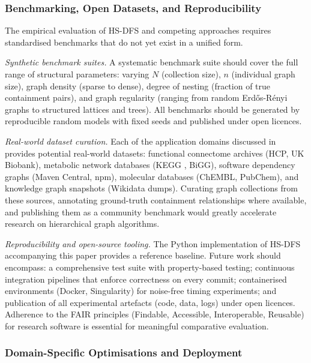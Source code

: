 ﻿\documentclass[12pt,a4paper]{article}
\theoremstyle{plain}
\theoremstyle{definition}
\theoremstyle{remark}
\begin{document}
	\subsubsection*{Benchmarking, Open Datasets, and Reproducibility}

	The empirical evaluation of HS-DFS and competing approaches requires
	standardised benchmarks that do not yet exist in a unified form.

	\emph{Synthetic benchmark suites.}  A systematic benchmark suite should
	cover the full range of structural parameters: varying $N$ (collection
	size), $n$ (individual graph size), graph density (sparse to dense),
	degree of nesting (fraction of true containment pairs), and graph
	regularity (ranging from random Erd\H{o}s-R\'enyi graphs to structured
	lattices and trees).  All benchmarks should be generated by reproducible
	random models with fixed seeds and published under open licences.

	\emph{Real-world dataset curation.}  Each of the application domains
	discussed in  provides potential real-world
	datasets: functional connectome archives (HCP, UK Biobank), metabolic
	network databases (KEGG \cite{kegg}, BiGG), software dependency graphs
	(Maven Central, npm), molecular databases (ChEMBL, PubChem), and
	knowledge graph snapshots (Wikidata dumps).  Curating graph collections
	from these sources, annotating ground-truth containment relationships
	where available, and publishing them as a community benchmark would
	greatly accelerate research on hierarchical graph algorithms.

	\emph{Reproducibility and open-source tooling.}  The Python implementation
	of HS-DFS accompanying this paper \cite{epp2026subgraph} provides a
	reference baseline.  Future work should encompass:
	a comprehensive test suite with property-based testing;
	continuous integration pipelines that enforce correctness on every commit;
	containerised environments (Docker, Singularity) for noise-free timing
	experiments;
	and publication of all experimental artefacts (code, data, logs) under
	open licences.  Adherence to the FAIR principles (Findable, Accessible,
	Interoperable, Reusable) for research software is essential for meaningful
	comparative evaluation.

	\subsubsection*{Domain-Specific Optimisations and Deployment}
\end{document}
